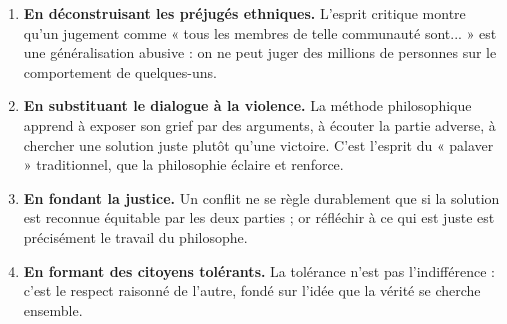 \documentclass[11pt]{article}
\begin{document}
\begin{enumerate}
\item \textbf{En déconstruisant les préjugés ethniques.} L'esprit critique montre qu'un jugement comme « tous les membres de telle communauté sont... » est une généralisation abusive : on ne peut juger des millions de personnes sur le comportement de quelques-uns.
\item \textbf{En substituant le dialogue à la violence.} La méthode philosophique apprend à exposer son grief par des arguments, à écouter la partie adverse, à chercher une solution juste plutôt qu'une victoire. C'est l'esprit du « palaver » traditionnel, que la philosophie éclaire et renforce.
\item \textbf{En fondant la justice.} Un conflit ne se règle durablement que si la solution est reconnue équitable par les deux parties ; or réfléchir à ce qui est juste est précisément le travail du philosophe.
\item \textbf{En formant des citoyens tolérants.} La tolérance n'est pas l'indifférence : c'est le respect raisonné de l'autre, fondé sur l'idée que la vérité se cherche ensemble.
\end{enumerate}
\end{document}
